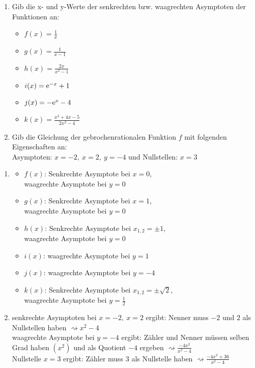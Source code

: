 \begin{enumerate}
	\item Gib die x- und y-Werte der senkrechten bzw. waagrechten Asymptoten der Funktionen an:
	\begin{multicols}{3}
	\begin{itemize}
		\item $f(x)=\frac{1}{x}$
		\item $g(x)=\frac{1}{x-1}$
		\item $h(x)=\frac{2x}{x^2-1}$
		\item $i(x)=\mathrm{e}^{-x}+1$
		\item $j(x)=-\mathrm{e}^{x}-4$
		\item $k(x)=\frac{x^2+4x-5}{2x^2-4}$
	\end{itemize}
	\end{multicols}
	\item Gib die Gleichung der gebrochenrationalen Funktion $f$ mit folgenden Eigenschaften an:\\
	Asymptoten: $x=-2,\ x=2,\ y=-4$ und Nullstellen: $x=3$
\end{enumerate}
\begin{lsg}{}
	\begin{enumerate}
	\item \begin{multicols}{2}
		\begin{itemize}
			\item $f(x)$: Senkrechte Asymptote bei $x=0$,\\ waagrechte Asymptote bei $y=0$
			\item $g(x)$: Senkrechte Asymptote bei $x=1$,\\ waagrechte Asymptote bei $y=0$
			\item $h(x)$: Senkrechte Asymptote bei $x_{1,2}=\pm 1$,\\ waagrechte Asymptote bei $y=0$
			\item $i(x)$: waagrechte Asymptote bei $y=1$
			\item $j(x)$: waagrechte Asymptote bei $y=-4$
			\item $k(x)$: Senkrechte Asymptote bei $x_{1,2}=\pm \sqrt{2}$,\\ waagrechte Asymptote bei $y=\frac{1}{2}$
		\end{itemize}
		\end{multicols}
		\item senkrechte Asymptoten bei $x=-2,\ x=2$ ergibt: Nenner muss $-2$ und $2$ als Nullstellen haben $\rightsquigarrow x^2-4$\\
		waagrechte Asymptote bei $y=-4$ ergibt: Zähler und Nenner müssen selben Grad haben $\left(x^2\right)$ und als Quotient $-4$ ergeben $\rightsquigarrow \frac{-4x^2}{x^2-4}$\\
		Nullstelle $x=3$ ergibt: Zähler muss $3$ als Nullstelle haben $\rightsquigarrow \frac{-4x^2+36}{x^2-4}$
	\end{enumerate}
\end{lsg}



